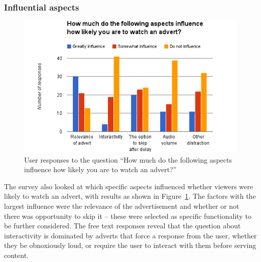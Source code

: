 \subsubsection{Influential aspects}
\label{sec:prestudy_influence}
\begin{figure}[H]
	\vspace{-10pt}
	\includegraphics[width=\textwidth, clip=true, trim=0 0 0 60pt]{images/prestudy_influence.png}
	\caption{User responses to the question ``How much do the following aspects influence how likely you are to watch an advert?''}
	\label{fig:prestudy_influence}
	\vspace{-25pt}
\end{figure}
The survey also looked at which specific aspects influenced whether viewers were likely to watch an advert, with results as shown in Figure~\ref{fig:prestudy_influence}. The factors with the largest influence were the relevance of the advertisement and whether or not there was opportunity to skip it -- these were selected as specific functionality to be further considered. 
The free text responses reveal that the question about interactivity is dominated by adverts that force a response from the user, whether they be obnoxiously loud, or require the user to interact with them before serving content. 



